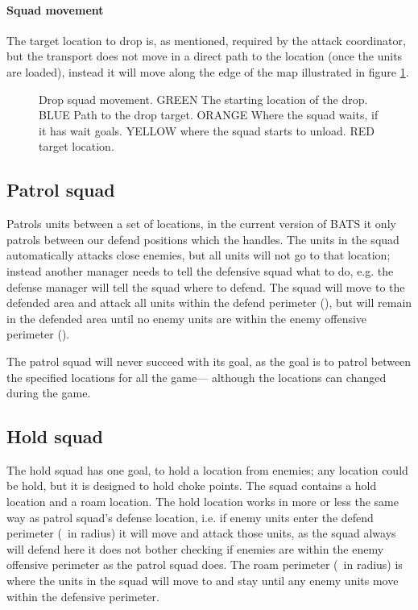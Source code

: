 
\paragraph{Squad movement}
The target location to drop is, as mentioned, required by the attack coordinator, but the transport does not move in a direct path to the location (once the units are loaded), instead it will move along the edge of the map illustrated in figure \ref{fig:drop_squad_movement}.
\begin{figure}[htb]
\caption[Drop squad movement]{Drop squad movement. GREEN The starting location of the drop. BLUE Path to the drop target. ORANGE Where the squad waits, if it has wait goals. YELLOW where the squad starts to unload. RED target location.}
\label{fig:drop_squad_movement}
\end{figure}

\subsection{Patrol squad}
\label{sec:patrol_squad}
Patrols units between a set of locations, in the current version of BATS it only patrols between our defend positions which the  handles. The units in the squad automatically attacks close enemies, but all units will not go to that location; instead another manager needs to tell the defensive squad what to do, e.g. the defense manager will tell the squad where to defend. The squad will move to the defended area and attack all units within the defend perimeter (\squadDefendDefendPerimeter), but will remain in the defended area until no enemy units are within the enemy offensive perimeter (\squadDefendEnemyOffensivePerimeter).

The patrol squad will never succeed with its goal, as the goal is to patrol between the specified locations for all the game— although the locations can changed during the game.


\subsection{Hold squad}
\label{sec:hold_squad}
The hold squad has one goal, to hold a location from enemies; any location could be hold, but it is designed to hold choke points. The squad contains a hold location and a roam location. The hold location works in more or less the same way as patrol squad's defense location, i.e. if enemy units enter the defend perimeter (\squadDefendDefendPerimeter~in radius) it will move and attack those units, as the squad always will defend here it does not bother checking if enemies are within the enemy offensive perimeter as the patrol squad does. The roam perimeter (\squadDefendRoamPerimeter~in radius) is where the units in the squad will move to and stay until any enemy units move within the defensive perimeter.

